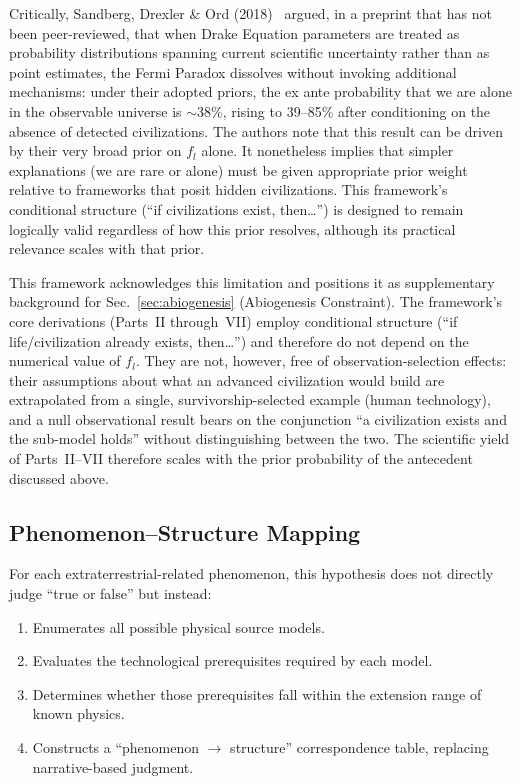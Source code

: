\documentclass[aps,prd,twocolumn,superscriptaddress,nofootinbib]{revtex4-2}
\begin{document}
Critically, Sandberg, Drexler \& Ord (2018)~\cite{Sandberg2018} argued, in a preprint that has not been peer-reviewed, that when Drake Equation parameters are treated as probability distributions spanning current scientific uncertainty rather than as point estimates, the Fermi Paradox dissolves without invoking additional mechanisms: under their adopted priors, the ex ante probability that we are alone in the observable universe is ${\sim}$38\%, rising to 39--85\% after conditioning on the absence of detected civilizations. The authors note that this result can be driven by their very broad prior on $f_{l}$ alone. It nonetheless implies that simpler explanations (we are rare or alone) must be given appropriate prior weight relative to frameworks that posit hidden civilizations. This framework's conditional structure (``if civilizations exist, then\ldots{}'') is designed to remain logically valid regardless of how this prior resolves, although its practical relevance scales with that prior.

This framework acknowledges this limitation and positions it as supplementary background for Sec.~\ref{sec:abiogenesis} (Abiogenesis Constraint). The framework's core derivations (Parts~II through~VII) employ conditional structure (``if life/civilization already exists, then\ldots{}'') and therefore do not depend on the numerical value of $f_{l}$. They are not, however, free of observation-selection effects: their assumptions about what an advanced civilization would build are extrapolated from a single, survivorship-selected example (human technology), and a null observational result bears on the conjunction ``a civilization exists and the sub-model holds'' without distinguishing between the two. The scientific yield of Parts~II--VII therefore scales with the prior probability of the antecedent discussed above.

\subsection{Phenomenon--Structure Mapping}\label{sec:phenom-struct}

For each extraterrestrial-related phenomenon, this hypothesis does not directly judge ``true or false'' but instead:

\begin{enumerate}
  \item Enumerates all possible physical source models.
  \item Evaluates the technological prerequisites required by each model.
  \item Determines whether those prerequisites fall within the extension range of known physics.
  \item Constructs a ``phenomenon $\to$ structure'' correspondence table, replacing narrative-based judgment.
\end{enumerate}
\end{document}
